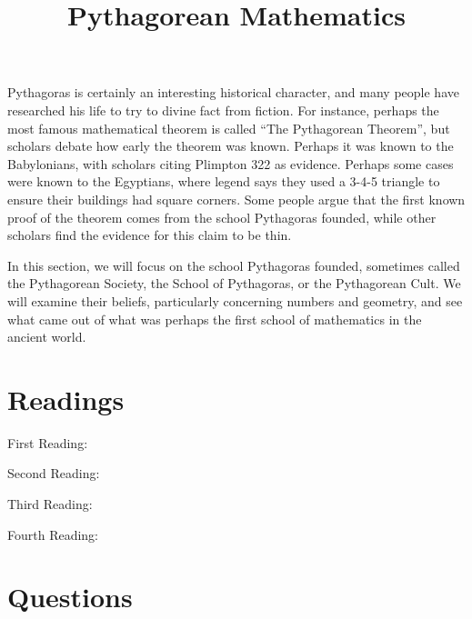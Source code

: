 \documentclass{ximera}
\title{Pythagorean Mathematics}
\begin{document}
\begin{abstract}
\end{abstract}
\maketitle

Pythagoras is certainly an interesting historical character, and many people have researched his life to try to divine fact from fiction.  For instance, perhaps the most famous mathematical theorem is called ``The Pythagorean Theorem'', but scholars debate how early the theorem was known.  Perhaps it was known to the Babylonians, with scholars citing Plimpton 322 as evidence.  Perhaps some cases were known to the Egyptians, where legend says they used a 3-4-5 triangle to ensure their buildings had square corners.  Some people argue that the first known proof of the theorem comes from the school Pythagoras founded, while other scholars find the evidence for this claim to be thin.  

In this section, we will focus on the school Pythagoras founded, sometimes called the Pythagorean Society, the School of Pythagoras, or the Pythagorean Cult.  We will examine their beliefs, particularly concerning numbers and geometry, and see what came out of what was perhaps the first school of mathematics in the ancient world.




\section{Readings}

First Reading: 

Second Reading: 

Third Reading: 

Fourth Reading: 






\section{Questions}
\end{document}
